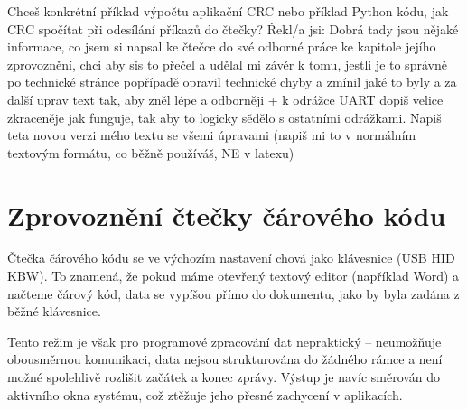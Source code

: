 Chceš konkrétní příklad výpočtu aplikační CRC nebo příklad Python kódu, jak CRC spočítat při odesílání příkazů do čtečky?
Řekl/a jsi:
Dobrá tady jsou nějaké informace, co jsem si napsal ke čtečce do své odborné práce ke kapitole jejího zprovoznění, chci aby sis to přečel a udělal mi závěr k tomu, jestli je to správně po technické stránce popřípadě opravil technické chyby a zmínil jaké to byly a za další uprav text tak, aby zněl lépe a odborněji + k odrážce UART dopiš velice zkraceněje jak funguje, tak aby to logicky sědělo s ostatními odrážkami. Napiš teta novou verzi mého textu se všemi úpravami (napiš mi to v normálním textovým formátu, co běžně používáš, NE v latexu)


\section{Zprovoznění čtečky čárového kódu}
\label{zprovozeni_ctecky}
Čtečka čárového kódu se ve výchozím nastavení chová jako klávesnice (USB HID KBW). To znamená, že pokud máme otevřený textový editor (například Word) a načteme čárový kód, data se vypíšou přímo do dokumentu, jako by byla zadána z běžné klávesnice.

Tento režim je však pro programové zpracování dat nepraktický – neumožňuje obousměrnou komunikaci, data nejsou strukturována do žádného rámce a není možné spolehlivě rozlišit začátek a konec zprávy. Výstup je navíc směrován do aktivního okna systému, což ztěžuje jeho přesné zachycení v aplikacích.

